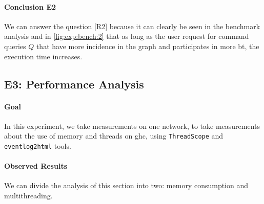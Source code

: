\paragraph{Conclusion E2} We can answer the question [R2] because it can clearly be seen in the benchmark analysis and in \autoref{fig:exp:bench:2} that as long as the user request for command queries $Q$ that have more incidence in the graph and participates in more \acrshort{bt},
the execution time increases.

\subsection{E3: Performance Analysis}\label{sub:sec:exp-3} 
\paragraph{Goal} In this experiment, we take measurements on one network, to take measurements about the use of memory and threads on \acrshort{ghc}, using
\texttt{ThreadScope} \cite{threadscope} and \texttt{eventlog2html} \cite{eventlog2html} tools. 

\paragraph{Observed Results}\label{sub:sec:res:e3}
We can divide the analysis of this section into two: memory consumption and multithreading.

